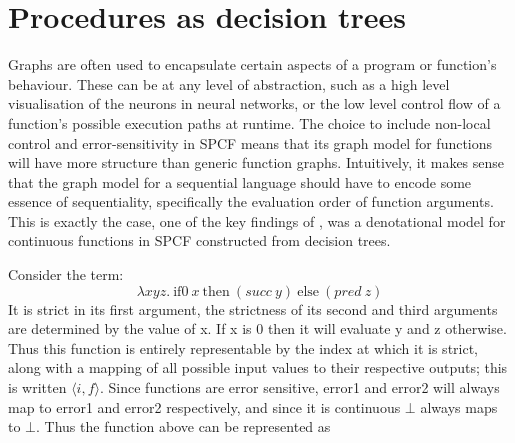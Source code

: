 \documentclass[12pt,a4paper]{report}
\theoremstyle{definition}
\theoremstyle{remark}
\begin{document}
\section{Procedures as decision trees}
Graphs are often used to encapsulate certain aspects of a program or function's behaviour. These can be at any level of abstraction, such as a high level visualisation of the neurons in neural networks, or the low level control flow of a function's possible execution paths at runtime. The choice to include non-local control and error-sensitivity in SPCF means that its graph model for functions will have more structure than generic function graphs. Intuitively, it makes sense that the graph model for a sequential language should have to encode some essence of sequentiality, specifically the evaluation order of function arguments. This is exactly the case, one of the key findings of \cite{cartwright_1992}, was a denotational model for continuous functions in SPCF constructed from decision trees. 

Consider the term:
\[\lambda xyz.\ \text{if0}\ x\ \text{then}\ (succ\ y)\ \text{else}\ (pred\ z)\]
It is strict in its first argument, the strictness of its second and third arguments are determined by the value of x. If x is 0 then it will evaluate y and z otherwise. Thus this function is entirely representable by the index at which it is strict, along with a mapping of all possible input values to their respective outputs; this is written $\langle i, f \rangle$. Since functions are error sensitive, error1 and error2 will always map to error1 and error2 respectively, and since it is continuous $\bot$ always maps to $\bot$. Thus the function above can be represented as
\end{document}
